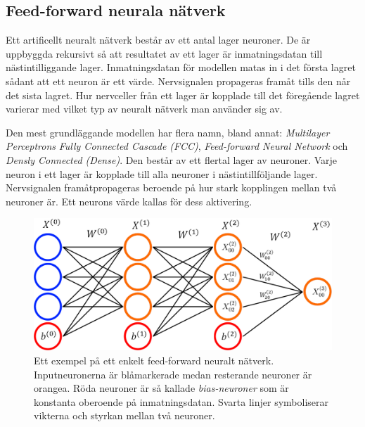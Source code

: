 \documentclass[a4paper,11pt,twoside]{article}
\begin{document}

\subsection{Feed-forward neurala nätverk}
Ett artificellt neuralt nätverk består av ett antal lager neuroner. De är uppbyggda rekursivt så att resultatet av ett lager är inmatningsdatan till nästintilliggande lager. Inmatningsdatan för modellen matas in i det första lagret sådant att ett neuron är ett värde. Nervsignalen propageras framåt tills den når det sista lagret. Hur nervceller från ett lager är kopplade till det föregående lagret varierar med vilket typ av neuralt nätverk man använder sig av. \cite{cs231n}

Den mest grundläggande modellen har flera namn, bland annat:  \textit{Multilayer Perceptrons} \textit{Fully Connected Cascade (FCC)}, \textit{Feed-forward Neural Network} och \textit{Densly Connected (Dense)}. Den består av ett flertal lager av neuroner. Varje neuron i ett lager är kopplade till alla neuroner i nästintillföljande lager. Nervsignalen framåtpropageras beroende på hur stark kopplingen mellan två neuroner är. Ett neurons värde kallas för dess aktivering. \cite{cs231n}

\begin{figure}[h]\label{figFCC}
	\centering
  		\includegraphics[scale=0.4]{FCC.png}
  	\caption{Ett exempel på ett enkelt feed-forward neuralt nätverk. Inputneuronerna är blåmarkerade medan resterande neuroner är orangea. Röda neuroner är så kallade \textit{bias-neuroner} som är konstanta oberoende på inmatningsdatan. Svarta linjer symboliserar vikterna och styrkan mellan två neuroner.}
\end{figure}
\end{document}

